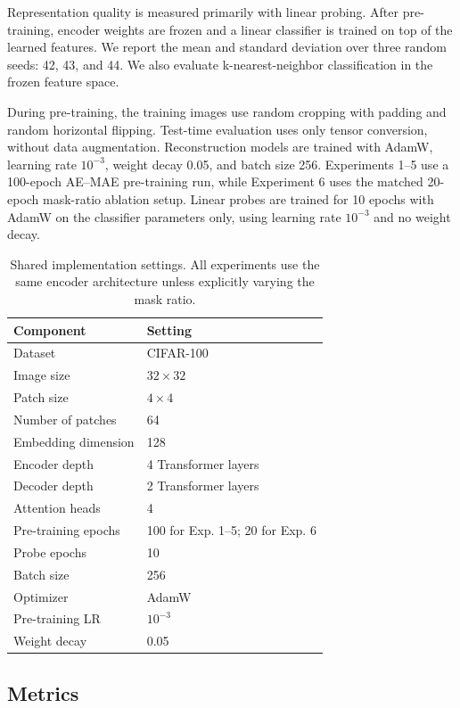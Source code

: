 \documentclass[10pt,twocolumn,letterpaper]{article}
\begin{document}
Representation quality is measured primarily with linear probing. After pre-training, encoder weights are frozen and a linear classifier is trained on top of the learned features. We report the mean and standard deviation over three random seeds: 42, 43, and 44. We also evaluate k-nearest-neighbor classification in the frozen feature space.

During pre-training, the training images use random cropping with padding and random horizontal flipping. Test-time evaluation uses only tensor conversion, without data augmentation. Reconstruction models are trained with AdamW, learning rate $10^{-3}$, weight decay 0.05, and batch size 256. Experiments 1--5 use a 100-epoch AE--MAE pre-training run, while Experiment 6 uses the matched 20-epoch mask-ratio ablation setup. Linear probes are trained for 10 epochs with AdamW on the classifier parameters only, using learning rate $10^{-3}$ and no weight decay.

\begin{table}[t]
\centering
\caption{Shared implementation settings. All experiments use the same encoder architecture unless explicitly varying the mask ratio.}
\label{tab:setup}
\begin{tabular}{ll}
\toprule
Component & Setting \\
\midrule
Dataset & CIFAR-100 \\
Image size & $32 \times 32$ \\
Patch size & $4 \times 4$ \\
Number of patches & 64 \\
Embedding dimension & 128 \\
Encoder depth & 4 Transformer layers \\
Decoder depth & 2 Transformer layers \\
Attention heads & 4 \\
Pre-training epochs & 100 for Exp. 1--5; 20 for Exp. 6 \\
Probe epochs & 10 \\
Batch size & 256 \\
Optimizer & AdamW \\
Pre-training LR & $10^{-3}$ \\
Weight decay & 0.05 \\
\bottomrule
\end{tabular}
\end{table}

\subsection{Metrics}
\end{document}
